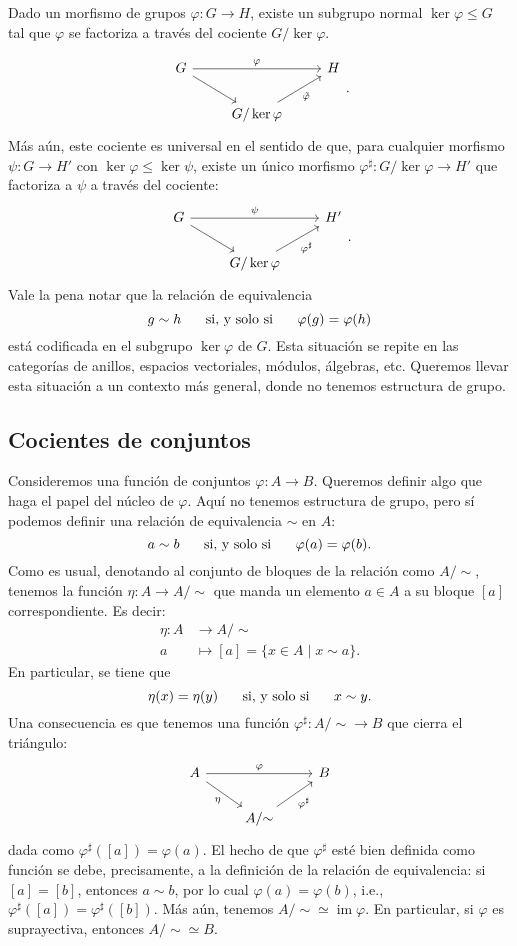 \documentclass[12pt,letterpaper,titlepage]{article}
\theoremstyle{definition}
\renewcommand\phi{\varphi}
\newcommand\simr{{\sim}}
\newcommand\ssi{\hspace{5mm}\text{ si, y solo si }\hspace{5mm}}
\newcommand\<{\langle}
\renewcommand\>{\rangle}
\DeclareMathOperator{\img}{im}
\begin{document}

Dado un morfismo de grupos $\phi:G\to H$, existe un subgrupo normal
$\ker \phi\leq G$ tal que $\phi$ se factoriza a través del cociente
$G/\ker \phi$.

\[
    \begin{tikzcd}
        G \ar[dr] \ar[rr,"\phi"] && H \\
        &G/\ker \phi \ar[ur,"\tilde\phi"']
    \end{tikzcd}
.\]
Más aún, este cociente es universal en el sentido de que, para cualquier 
morfismo $\psi:G\to H'$ con $\ker\phi \leq \ker\psi$, existe un único
morfismo $\phi^\sharp:G/\ker\phi\to H'$ que factoriza a $\psi$ a través
del cociente:
\[
    \begin{tikzcd}
        G \ar[dr] \ar[rr,"\psi"] && H' \\
        &G/\ker \phi \ar[ur,"\phi^\sharp"']
    \end{tikzcd}
.\]
Vale la pena notar que la relación de equivalencia
\[
    g\sim h \ssi \phi(g) = \phi(h)
\]
está codificada en el subgrupo $\ker \phi$ de $G$.
Esta situación se repite en las categorías de anillos,
espacios vectoriales, módulos, álgebras, etc.
Queremos llevar esta situación a un contexto más general,
donde no tenemos estructura de grupo.

\subsection{Cocientes de conjuntos}
Consideremos una función de conjuntos $\phi:A\to B$.
Queremos definir algo que haga el papel del núcleo de $\phi$.
Aquí no tenemos estructura de grupo, pero sí podemos definir una relación
de equivalencia $\sim$ en $A$:
\[
    a\sim b \ssi \phi(a) = \phi(b)
.\]
Como es usual, denotando al conjunto de bloques de la relación como
$A/\simr$, tenemos la función $\eta: A\to A/\simr$ que manda un elemento
$a\in A$ a su bloque $[a]$ correspondiente.
Es decir:
\begin{align*}
    \eta:A&\to A/\simr \\
    a&\mapsto [a] = \{x\in A \mid x\sim a\}.
\end{align*}
En particular, se tiene que
\[
    \eta(x) = \eta(y) \ssi x\sim y
.\]
Una consecuencia es que tenemos una función
$\phi^\sharp:A/\simr \to B$ que cierra el triángulo:
\[
\begin{tikzcd}
    A\ar[rr,"\phi"] \ar[dr,"\eta"'] && B \\
    & A/\simr \ar[ur,"\phi^\sharp"']
\end{tikzcd}
\]
dada como $\phi^\sharp([a]) = \phi(a)$.
El hecho de que $\phi^\sharp$ esté bien definida como función se debe,
precisamente, a la definición de la relación de equivalencia:
si $[a]=[b]$, entonces $a\sim b$, por lo cual $\phi(a)=\phi(b)$, i.e.,
$\phi^\sharp([a])=\phi^\sharp([b])$.
Más aún, tenemos $A/\simr\simeq \img \phi$.
En particular, si $\phi$ es suprayectiva, entonces $A/\simr \simeq B$.
\end{document}
